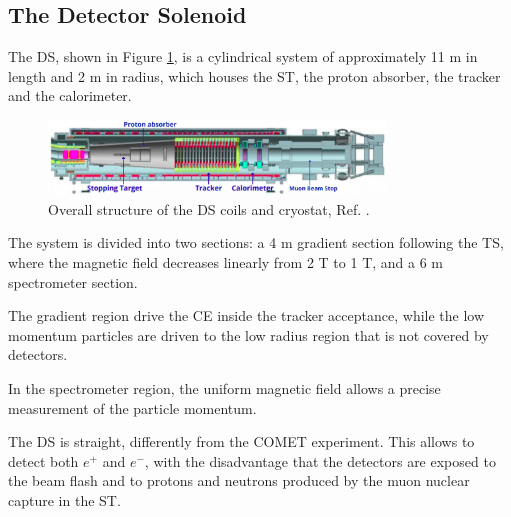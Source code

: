 \subsection{The Detector Solenoid}\label{detectorsolenoid}
The DS, shown in Figure \ref{fig:DS}, is a cylindrical system of approximately 11 m in 
length and 2 m in radius, which houses the ST, 
the proton absorber, the tracker and the calorimeter. 
\begin{figure}[!h]
    \centering
    \includegraphics[width =0.8\textwidth]{figures/png/Screenshot_20240306_225639.png}
    \caption[The structure of the Detector Solenoid coils and cryostat.]{Overall structure of the DS coils and cryostat, Ref. \cite{bobbb}.}
    \label{fig:DS}
    \end{figure}
The system is divided into two sections: a 4 m gradient section following the TS, 
where the magnetic field decreases linearly from 2 T to 1 T, and a 6 
m spectrometer section. 

The gradient region drive the CE 
inside the tracker acceptance, while the low momentum particles 
are driven to the low radius region that is not covered by detectors.  

In the spectrometer region, the uniform magnetic field allows a precise 
measurement of the particle momentum. 

The DS is straight, differently from the COMET experiment. This allows 
to detect both $e^+$ and $e^-$, with the disadvantage that the detectors are exposed to the 
beam flash and to protons and neutrons produced by the muon
nuclear capture in the ST.

